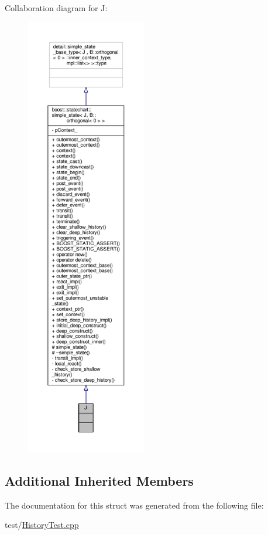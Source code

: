 Collaboration diagram for J\+:
\nopagebreak
\begin{figure}[H]
\begin{center}
\leavevmode
\includegraphics[height=550pt]{struct_j__coll__graph}
\end{center}
\end{figure}
\subsection*{Additional Inherited Members}


The documentation for this struct was generated from the following file\+:\begin{DoxyCompactItemize}
\item 
test/\mbox{\hyperlink{_history_test_8cpp}{History\+Test.\+cpp}}\end{DoxyCompactItemize}
